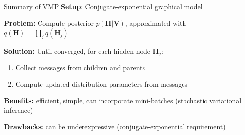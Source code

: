 \documentclass[10pt, compress]{beamer}
\begin{document}
\begin{frame}{Summary of VMP}
  \textbf{Setup:} Conjugate-exponential graphical model

  \pause
  \textbf{Problem:} Compute posterior $p(\mathbf{H} | \mathbf{V})$, approximated with $q(\mathbf{H}) = \prod_j q(\mathbf{H}_j)$

  \pause
  \textbf{Solution:} Until converged, for each hidden node $\mathbf{H}_j$:
  \begin{enumerate}
    \pause
  \item Collect messages from children and parents
    \pause
  \item Compute updated distribution parameters from messages
\end{enumerate}

\pause
\textbf{Benefits:} efficient, simple, can incorporate mini-batches (stochastic variational inference)

\pause
\textbf{Drawbacks:} can be underexpressive (conjugate-exponential requirement)
\end{frame}
\end{document}
